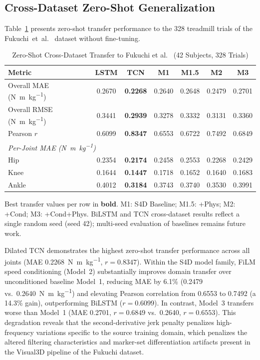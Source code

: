 \documentclass[journal]{IEEEtran}
\newcommand{\Nmskg}{\si{\newton\metre\per\kilogram}}
\begin{document}
\subsection{Cross-Dataset Zero-Shot Generalization}
Table~\ref{tab:crossdataset} presents zero-shot transfer performance to the 328 treadmill trials of the Fukuchi~et~al.~\cite{fukuchi2018public} dataset without fine-tuning.

\begin{table}[!t]
\centering
\caption{Zero-Shot Cross-Dataset Transfer to Fukuchi et al.~\cite{fukuchi2018public} (42 Subjects, 328 Trials)}
\label{tab:crossdataset}
\setlength{\tabcolsep}{2.2pt}
\renewcommand{\arraystretch}{1.05}
\footnotesize
\begin{tabular}{@{}l cccccc@{}}
\toprule
\textbf{Metric} & \textbf{LSTM} & \textbf{TCN} & \textbf{M1} & \textbf{M1.5} & \textbf{M2} & \textbf{M3} \\
\midrule
Overall MAE (\Nmskg) & 0.2670 & \textbf{0.2268} & 0.2640 & 0.2648 & 0.2479 & 0.2701 \\
Overall RMSE (\Nmskg) & 0.3441 & \textbf{0.2939} & 0.3278 & 0.3332 & 0.3131 & 0.3360 \\
Pearson $r$ & 0.6099 & \textbf{0.8347} & 0.6553 & 0.6722 & 0.7492 & 0.6849 \\
\midrule
\multicolumn{7}{l}{\emph{Per-Joint MAE (\Nmskg)}} \\
Hip & 0.2354 & \textbf{0.2174} & 0.2458 & 0.2553 & 0.2268 & 0.2429 \\
Knee & 0.1644 & \textbf{0.1447} & 0.1718 & 0.1652 & 0.1640 & 0.1683 \\
Ankle & 0.4012 & \textbf{0.3184} & 0.3743 & 0.3740 & 0.3530 & 0.3991 \\
\bottomrule
\end{tabular}
\par\vspace{1mm}
{\raggedright\scriptsize Best transfer values per row in \textbf{bold}. M1: S4D Baseline; M1.5: +Phys; M2: +Cond; M3: +Cond+Phys. BiLSTM and TCN cross-dataset results reflect a single random seed (seed 42); multi-seed evaluation of baselines remains future work.\par}
\end{table}

Dilated TCN demonstrates the highest zero-shot transfer performance across all joints (MAE 0.2268~\Nmskg{}, $r = 0.8347$). Within the S4D model family, FiLM speed conditioning (Model~2) substantially improves domain transfer over unconditioned baseline Model~1, reducing MAE by 6.1\% (0.2479 vs.\ 0.2640~\Nmskg{}) and elevating Pearson correlation from 0.6553 to 0.7492 (a 14.3\% gain), outperforming BiLSTM ($r = 0.6099$). In contrast, Model~3 transfers worse than Model~1 (MAE 0.2701, $r = 0.6849$ vs.\ 0.2640, $r = 0.6553$). This degradation reveals that the second-derivative jerk penalty penalizes high-frequency variations specific to the source training domain, which penalizes the altered filtering characteristics and marker-set differentiation artifacts present in the Visual3D pipeline of the Fukuchi dataset.
\end{document}
